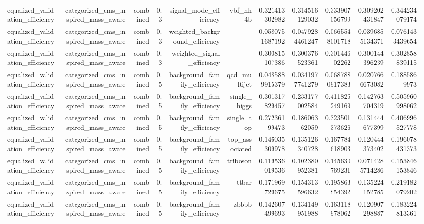 \begin{table}[htbp]
{\begin{tabular}{lrrrrrrrrrr}
equalized\_validation\_efficiency & categorized\_cms\_inspired\_mass\_aware & combined & 0.3 & signal\_mode\_efficiency & vbf\_hh4b & 0.321413302982 & 0.314516129032 & 0.333907056799 & 0.309202431847 & 0.344234079174 \\
equalized\_validation\_efficiency & categorized\_cms\_inspired\_mass\_aware & combined & 0.3 & weighted\_background\_efficiency &  & 0.0580751687192 & 0.0479284461247 & 0.0665548001718 & 0.0396855134371 & 0.0761433439654 \\
equalized\_validation\_efficiency & categorized\_cms\_inspired\_mass\_aware & combined & 0.3 & weighted\_signal\_efficiency &  & 0.300815107386 & 0.300376523361 & 0.30144602262 & 0.300144396239 & 0.302858839115 \\
equalized\_validation\_efficiency & categorized\_cms\_inspired\_mass\_aware & combined & 0.5 & background\_family\_efficiency & qcd\_multijet & 0.0485889915379 & 0.0341977741279 & 0.0687880917383 & 0.0207666673082 & 0.1885869973 \\
equalized\_validation\_efficiency & categorized\_cms\_inspired\_mass\_aware & combined & 0.5 & background\_family\_efficiency & single\_higgs & 0.301317829457 & 0.233177002584 & 0.411825249169 & 0.142763704319 & 0.505960998062 \\
equalized\_validation\_efficiency & categorized\_cms\_inspired\_mass\_aware & combined & 0.5 & background\_family\_efficiency & single\_top & 0.27236199473 & 0.18606362059 & 0.323501373626 & 0.131444677399 & 0.406996527778 \\
equalized\_validation\_efficiency & categorized\_cms\_inspired\_mass\_aware & combined & 0.5 & background\_family\_efficiency & top\_associated & 0.146035309978 & 0.135126340728 & 0.167784618903 & 0.120444373402 & 0.196078431373 \\
equalized\_validation\_efficiency & categorized\_cms\_inspired\_mass\_aware & combined & 0.5 & background\_family\_efficiency & triboson & 0.119536019536 & 0.102380952381 & 0.145630769231 & 0.0714285714286 & 0.153846153846 \\
equalized\_validation\_efficiency & categorized\_cms\_inspired\_mass\_aware & combined & 0.5 & background\_family\_efficiency & ttbar & 0.171969729675 & 0.154313596632 & 0.195863854392 & 0.135224152785 & 0.219182079202 \\
equalized\_validation\_efficiency & categorized\_cms\_inspired\_mass\_aware & combined & 0.5 & background\_family\_efficiency & zbbbb & 0.142607499693 & 0.134149951988 & 0.163118978062 & 0.120907298887 & 0.183224813361 \\

\end{tabular}}
\end{table}
